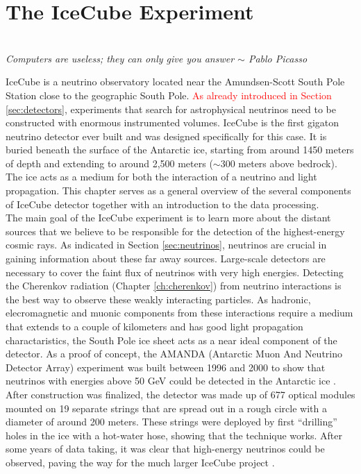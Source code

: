 \chapter{The IceCube Experiment}
\label{ch:icecube}
\begin{flushright}
\textit{\\Computers are useless; they can only give you answer $\sim$ Pablo Picasso\\}
\end{flushright}
IceCube is a neutrino observatory located near the Amundsen-Scott South Pole Station close to the geographic South Pole. \textcolor{red}{As already introduced in Section \ref{sec:detectors}}, experiments that search for astrophysical neutrinos need to be constructed with enormous instrumented volumes. IceCube is the first gigaton neutrino detector ever built and was designed specifically for this case. It is buried beneath the surface of the Antarctic ice, starting from around 1450 meters of depth and extending to around 2,500 meters ($\sim$300 meters above bedrock). The ice acts as a medium for both the interaction of a neutrino and light propagation. This chapter serves as a general overview of the several components of IceCube detector together with an introduction to the data processing.\\
\newline
\noindent The main goal of the IceCube experiment is to learn more about the distant sources that we believe to be responsible for the detection of the highest-energy cosmic rays. As indicated in Section \ref{sec:neutrinos}, neutrinos are crucial in gaining information about these far away sources. Large-scale detectors are necessary to cover the faint flux of neutrinos with very high energies. Detecting the Cherenkov radiation (Chapter \ref{ch:cherenkov}) from neutrino interactions is the best way to observe these weakly interacting particles. As hadronic, elecromagnetic and muonic components from these interactions require a medium that extends to a couple of kilometers and has good light propagation charactaristics, the South Pole ice sheet acts as a near ideal component of the detector. As a proof of concept, the AMANDA (Antarctic Muon And Neutrino Detector Array) experiment was built between 1996 and 2000 to show that neutrinos with energies above 50 GeV could be detected in the Antarctic ice \cite{amandaurl,Andres:1999hm}. After construction was finalized, the detector was made up of 677 optical modules mounted on 19 separate strings that are spread out in a rough circle with a diameter of around 200 meters. These strings were deployed by first ``drilling'' holes in the ice with a hot-water hose, showing that the technique works. After some years of data taking, it was clear that high-energy neutrinos could be observed, paving the way for the much larger IceCube project \cite{Ahrens:2002gq}.


